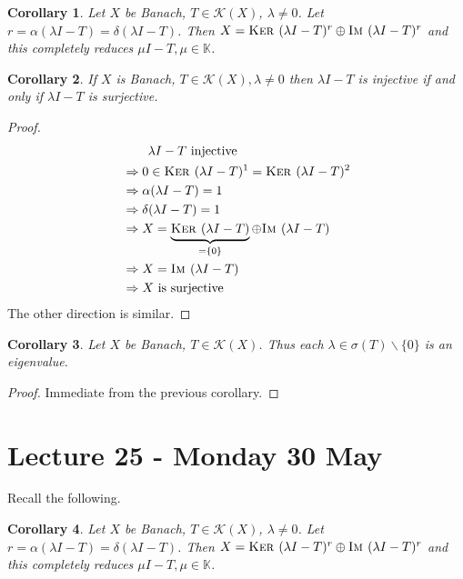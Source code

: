 \documentclass[10pt, oneside, reqno]{amsart}
\theoremstyle{plain}%
\newtheorem*{cor}{Corollary}
\theoremstyle{definition}
\theoremstyle{remark}
\newcommand{\K}{\mathbb{K}}
\newcommand{\im}{\textsc{Im\ }}
\renewcommand{\ker}{\textsc{Ker\ }}
\begin{document}
\begin{cor}
	Let $X$ be Banach, $T \in \mathcal K(X)$, $\lambda \neq 0$.  Let $r = \alpha(\lambda I - T) = \delta(\lambda I - T)$.  Then $X = \ker(\lambda I - T)^r \oplus \im(\lambda I - T)^r$ and this completely reduces $\mu I - T, \mu \in \K$.
\end{cor}

\begin{cor}
	If $X$ is Banach, $T \in \mathcal K(X), \lambda \neq 0$ then $\lambda I - T$ is injective if and only if $\lambda I - T$ is surjective.  
\end{cor}

\begin{proof}
	\begin{align*}
		&\qquad 		\text{$\lambda I - T$ injective} \\
		&\Rightarrow 0 \in \ker(\lambda I - T)^1 = \ker(\lambda I - T)^2 \\
		&\Rightarrow \alpha(\lambda I - T) = 1 \\
		&\Rightarrow \delta(\lambda I - T) = 1 \\
		&\Rightarrow X = \underbrace{\ker(\lambda I - T)}_{= \{ 0 \}} \oplus \im(\lambda I - T) \\
		&\Rightarrow X = \im (\lambda I - T) \\
		&\Rightarrow \text{$X$ is surjective}
	\end{align*}  The other direction is similar.
\end{proof}

\begin{cor}
	Let $X$ be Banach, $T \in \mathcal K(X)$.  Thus each $\lambda \in \sigma(T) \backslash \{ 0 \}$ is an eigenvalue.  
\end{cor}
\begin{proof}
	Immediate from the previous corollary.
\end{proof}




\section{Lecture 25 - Monday 30 May} %
\label{sec:lecture_25_monday_30_may}
Recall the following.
\begin{cor}
	Let $X$ be Banach, $T \in \mathcal K(X)$, $\lambda \neq 0$.  Let $r = \alpha(\lambda I - T) = \delta(\lambda I - T)$.  Then $X = \ker(\lambda I - T)^r \oplus \im(\lambda I - T)^r$ and this completely reduces $\mu I - T, \mu \in \K$.
\end{cor}
\end{document}
